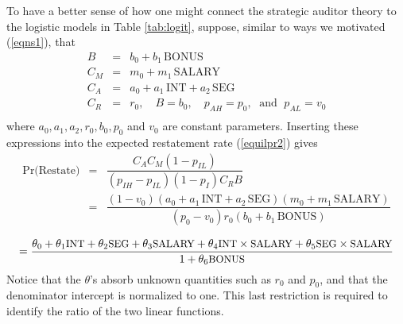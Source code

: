 To have a better sense of how one might connect the strategic auditor theory to the
logistic models in Table \ref{tab:logit}, suppose, similar to ways we motivated (\ref{eqns1}), that 
\begin{equation}\begin{array}{lcl}\label{eqns2}
B & = & b_0 + b_1 \, \mbox{BONUS} \\[.5em]
C_M & = & m_0 + m_1 \, \mbox{SALARY} \\[.5em]
C_A & = & a_0 + a_1 \, \mbox{INT} + a_2 \, \mbox{SEG}\\[.5em]
C_R & = & r_0, \quad B  =  b_0, \quad p_{AH}   =  p_0, \; \mbox{ and } \; p_{AL}  =  v_0 \\[.5em]
\end{array}
\end{equation}
where $ a_0, a_1, a_2, r_0, b_0, p_0$ and $v_0$ are constant parameters. 
Inserting these expressions into the expected restatement rate (\ref{equilpr2}) gives
\begin{equation*} \label{equilpr3}
\begin{array}{lcl}
\mbox{Pr(Restate)}& = &  \dfrac{C_AC_M(1-p_{IL})}{(p_{IH}-p_{IL})(1-p_I)C_RB}\\[2em]
& = & \dfrac{(1-v_0)(a_0 + a_1 \, \mbox{INT} + a_2 \, \mbox{SEG})(m_0 + m_1 \, \mbox{SALARY})}
{(p_0-v_0)r_0(b_0 + b_1 \, \mbox{BONUS})}\\[2em]
\end{array}
\end{equation*}
\begin{equation}\label{equilpr4}
 =  \dfrac{\theta_0 + \theta_1\mbox{\small INT} + \theta_2\mbox{\small SEG} + \theta_3\mbox{\small SALARY}
+ \theta_4\mbox{\small INT} \times \mbox{\small SALARY}+ \theta_5\mbox{\small SEG} \times \mbox{\small SALARY}}
{1 +  \theta_6\mbox{\small BONUS}}
\end{equation}
Notice that the $\theta$'s absorb unknown quantities such as $r_0$ and $p_0$, and that the denominator intercept
is normalized to one. This last restriction is required to identify the ratio of the two linear functions.


